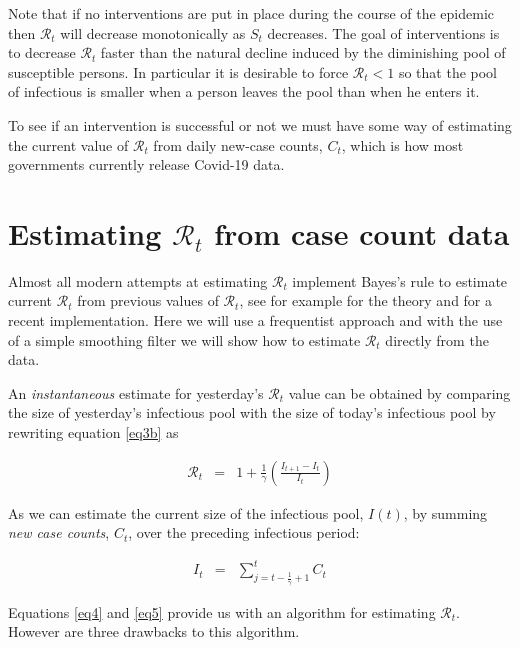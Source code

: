 \documentclass[11pt]{article}
\begin{document}
Note that if no interventions are put in place during the course of the epidemic 
then $\mathcal{R}_t$ will decrease monotonically as $S_t$ decreases.
The goal of interventions is to decrease $\mathcal{R}_t$ faster than
the natural decline induced by the diminishing pool of susceptible persons.
In particular it is desirable to force $\mathcal{R}_t < 1$ so that 
the pool of infectious is smaller when a person leaves the pool
than when he enters it. 

To see if an intervention is successful or not we must have some
way of estimating the current value of $\mathcal{R}_t$ from 
daily new-case counts, $C_t$, which is how most governments currently
release Covid-19 data.

\section{Estimating $\mathcal{R}_t$ from case count data}

Almost all modern attempts at estimating $\mathcal{R}_t$ implement
Bayes's rule to estimate current $\mathcal{R}_t$ from previous values
of $\mathcal{R}_t$, see for example \cite{bettencourt} for the theory 
and \cite{systrom} for a recent implementation. Here we will use a
frequentist approach and with the use of a simple smoothing filter
we will show how to estimate $\mathcal{R}_t$ directly from the data.

An {\it instantaneous} estimate for yesterday's $\mathcal{R}_t$ value can be obtained
by comparing the size of yesterday's infectious pool with the size
of today's infectious pool by rewriting equation \ref{eq3b} as 

\begin{eqnarray}
\mathcal{R}_t  & =  & 1 + \frac{1}{\gamma}  \left( \frac{ I_{t+1} - I_t} {I_t }  \right) \label{eq4} 
\end{eqnarray}

As we can estimate the current size of the infectious pool, $I(t)$,  by 
summing {\it new case counts}, $C_t$, over the preceding infectious period:

\begin{eqnarray}
I_t  & =  & \sum_{j=t-\frac{1}{\gamma}+1}^t C_t \label{eq5} 
\end{eqnarray}

Equations \ref{eq4} and \ref{eq5} provide us with an algorithm for estimating $\mathcal{R}_t$.
However are three drawbacks to this algorithm.
\end{document}
